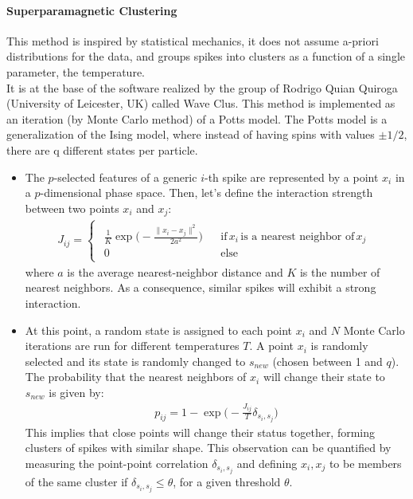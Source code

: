 \paragraph{Superparamagnetic Clustering}
This method is inspired by statistical mechanics, it does not assume a-priori distributions for the data, and groups spikes into clusters as a function of a single parameter, the temperature.\\
It is at the base of the software realized by the group of Rodrigo Quian Quiroga (University of Leicester, UK) called Wave Clus.
This method is implemented as an iteration (by Monte Carlo method) of a Potts model. The Potts model is a generalization of the Ising model, where instead of having spins with values \(\pm1/2\), there are q different states per particle.
\begin{itemize}
    \item The \(p\)-selected features of a generic \(i\)-th spike are represented by a point \(x_i\) in a \(p\)-dimensional phase space. Then, let's define the interaction strength between two points \(x_i\) and \(x_j\):
    \begin{align*}
        J_{ij}=
        \begin{cases}
            \begin{matrix}
                \frac{1}{K}\exp{\biggl(-\frac{\|x_i-x_j\|^2}{2a^2}\biggr)} &  & \text{if}\,x_i\,\text{is a nearest neighbor of}\,x_j \\
                0                                                          &  & \text{else}
            \end{matrix}
        \end{cases}
    \end{align*}
    where \(a\) is the average nearest-neighbor distance and \(K\) is the number of nearest neighbors. As a consequence, similar spikes will exhibit a strong interaction.
    \item At this point, a random state is assigned to each point \(x_i\) and \(N\) Monte Carlo iterations are run for different temperatures \(T\). A point \(x_i\) is randomly selected and its state is randomly changed to \(s_{new}\) (chosen between 1 and \(q\)). The probability that the nearest neighbors of \(x_i\) will change their state to \(s_{new}\) is given by: 
    \begin{align*}
    p_{ij}=1-\exp{\biggl(-\frac{J_{ij}}{T}\delta_{s_i,s_j}\biggr)}
    \end{align*}
    This implies that close points will change their status together, forming clusters of spikes with similar shape. This observation can be quantified by measuring the point-point correlation \(\delta_{s_i,s_j}\) and defining \(x_i,x_j\) to be members of the same cluster if \(\delta_{s_i,s_j}\leq\theta\), for a given threshold \(\theta\).\\

\end{itemize}
